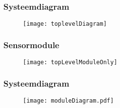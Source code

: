 
\begin{frame}
    \frametitle{Systeemdiagram}

    \begin{figure}
        \centering
        \texttt{[image: toplevelDiagram]}
    \end{figure}

\end{frame}

\begin{frame}
    \frametitle{Sensormodule}

    \begin{figure}
        \centering
        \texttt{[image: topLevelModuleOnly]}
    \end{figure}

\end{frame}



\begin{frame}
    \frametitle{Systeemdiagram}
    
    \begin{figure}
        \centering
        \texttt{[image: moduleDiagram.pdf]}
    \end{figure}
    
\end{frame}